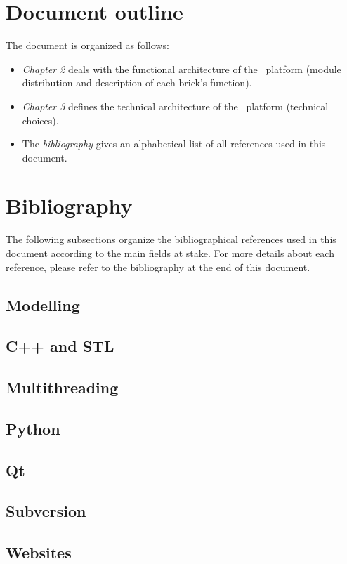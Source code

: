 \section{Document outline}
The document is organized as follows:
\begin{itemize}
\item \emph{Chapter 2} deals with the functional architecture of the \OT\ platform (module distribution and description of each brick's function).
\item \emph{Chapter 3} defines the technical architecture of the \OT\ platform (technical choices).
\item The \emph{bibliography} gives an alphabetical list of all references used in this document.
\end{itemize}

\section{Bibliography}
The following subsections organize the bibliographical references used in this document according to the main fields at stake. For more details about each reference, please refer to the bibliography at the end of this document.
\subsection{Modelling}
\cite{UML}
\cite{GoF}
\subsection{C++ and STL}
\cite{ARM}
\cite{C++}
\cite{EffC++}
\cite{MeffC++}
\cite{ModC++}
\cite{GenSTL}
\cite{EffSTL}
\subsection{Multithreading}
\cite{Thr}
\subsection{Python}
\cite{LearnPy}
\cite{ProgPy}
\cite{PY}
\subsection{Qt}
\cite{ProgQt}
\subsection{Subversion}
\cite{SvnBook}
\cite{SVNWeb}
\subsection{Websites}
\cite{SWIG}
\cite{BOOST}
\cite{OT}
\cite{OTDev}
\cite{UNICODE}
\cite{R}

